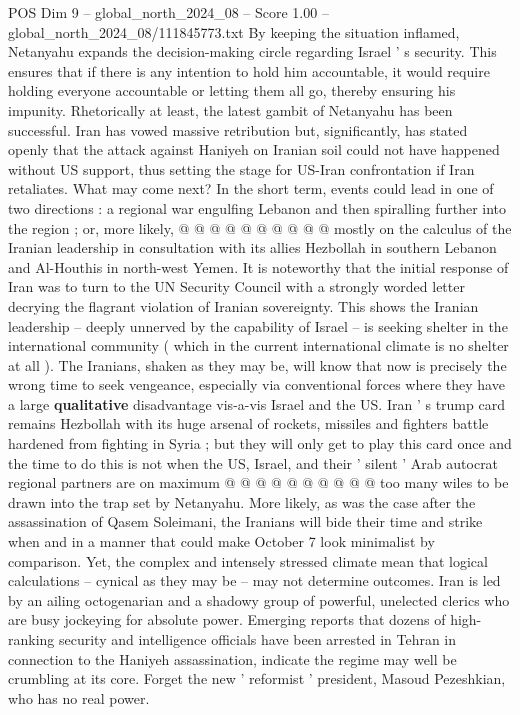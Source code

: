 \begin{textsample}{POS Dim 9 – global\_north\_2024\_08 – Score 1.00 – global\_north\_2024\_08/111845773.txt}
By keeping the situation inflamed, Netanyahu expands the decision-making circle regarding Israel ' s security.
This ensures that if there is any intention to hold him accountable, it would require holding everyone accountable or letting them all go, thereby ensuring his impunity.
Rhetorically at least, the latest gambit of Netanyahu has been successful.
Iran has vowed massive retribution but, significantly, has stated openly that the attack against Haniyeh on Iranian soil could not have happened without US support, thus setting the stage for US-Iran confrontation if Iran retaliates.
What may come next?
In the short term, events could lead in one of two directions : a regional war engulfing Lebanon and then spiralling further into the region ; or, more likely, @ @ @ @ @ @ @ @ @ @ mostly on the calculus of the Iranian leadership in consultation with its allies Hezbollah in southern Lebanon and Al-Houthis in north-west Yemen.
It is noteworthy that the initial response of Iran was to turn to the UN Security Council with a strongly worded letter decrying the flagrant violation of Iranian sovereignty.
This shows the Iranian leadership -- deeply unnerved by the capability of Israel -- is seeking shelter in the international community ( which in the current international climate is no shelter at all ).
The Iranians, shaken as they may be, will know that now is precisely the wrong time to seek vengeance, especially via conventional forces where they have a large \textbf{qualitative} disadvantage vis-a-vis Israel and the US.
Iran ' s trump card remains Hezbollah with its huge arsenal of rockets, missiles and fighters battle hardened from fighting in Syria ; but they will only get to play this card once and the time to do this is not when the US, Israel, and their ' silent ' Arab autocrat regional partners are on maximum @ @ @ @ @ @ @ @ @ @ too many wiles to be drawn into the trap set by Netanyahu.
More likely, as was the case after the assassination of Qasem Soleimani, the Iranians will bide their time and strike when and in a manner that could make October 7 look minimalist by comparison.
Yet, the complex and intensely stressed climate mean that logical calculations -- cynical as they may be -- may not determine outcomes.
Iran is led by an ailing octogenarian and a shadowy group of powerful, unelected clerics who are busy jockeying for absolute power.
Emerging reports that dozens of high-ranking security and intelligence officials have been arrested in Tehran in connection to the Haniyeh assassination, indicate the regime may well be crumbling at its core.
Forget the new ' reformist ' president, Masoud Pezeshkian, who has no real power.

\end{textsample}

